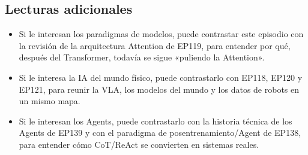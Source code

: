 \documentclass[a4paper]{article}
\begin{document}
\subsection{Lecturas adicionales}

\begin{itemize}
\item Si le interesan los paradigmas de modelos, puede contrastar este episodio con la revisión de la arquitectura Attention de EP119, para entender por qué, después del Transformer, todavía se sigue «puliendo la Attention».
\item Si le interesa la IA del mundo físico, puede contrastarlo con EP118, EP120 y EP121, para reunir la VLA, los modelos del mundo y los datos de robots en un mismo mapa.
\item Si le interesan los Agents, puede contrastarlo con la historia técnica de los Agents de EP139 y con el paradigma de posentrenamiento/Agent de EP138, para entender cómo CoT/ReAct se convierten en sistemas reales.
\end{itemize}
\end{document}

